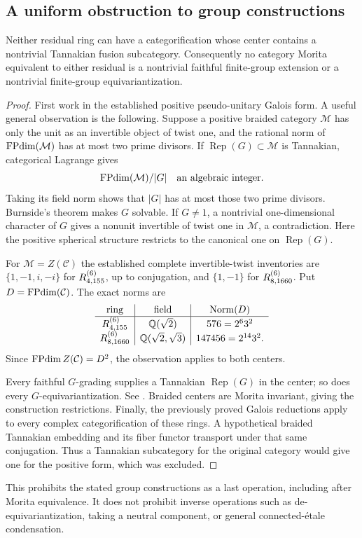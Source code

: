 \subsection{A uniform obstruction to group constructions}
\begin{proposition}\label{refined:prop:no-tannakian}
Neither residual ring can have a categorification whose center contains a nontrivial Tannakian fusion subcategory. Consequently no category Morita equivalent to either residual is a nontrivial faithful finite-group extension or a nontrivial finite-group equivariantization.
\end{proposition}
\begin{proof}
First work in the established positive pseudo-unitary Galois form. A useful general observation is the following. Suppose a positive braided category $\mathcal M$ has only the unit as an invertible object of twist one, and the rational norm of $\operatorname{FPdim}(\mathcal M)$ has at most two prime divisors. If $\operatorname{Rep}(G)\subset\mathcal M$ is Tannakian, categorical Lagrange gives
\[
 \operatorname{FPdim}(\mathcal M)/|G|\quad\hbox{an algebraic integer}.
\]
Taking its field norm shows that $|G|$ has at most those two prime divisors. Burnside's theorem makes $G$ solvable. If $G\ne1$, a nontrivial one-dimensional character of $G$ gives a nonunit invertible of twist one in $\mathcal M$, a contradiction. Here the positive spherical structure restricts to the canonical one on $\operatorname{Rep}(G)$.

For $\mathcal M=Z(\mathcal C)$ the established complete invertible-twist inventories are $\{1,-1,i,-i\}$ for $R^{(6)}_{4,155}$, up to conjugation, and $\{1,-1\}$ for $R^{(6)}_{8,1660}$. Put $D=\operatorname{FPdim}(\mathcal C)$. The exact norms are
\[
 \begin{array}{c|c|c}
 \text{ring}&\text{field}&\operatorname{Norm}(D)\\\hline
 R^{(6)}_{4,155}&\mathbb Q(\sqrt2)&576=2^6 3^2\\
 R^{(6)}_{8,1660}&\mathbb Q(\sqrt2,\sqrt3)&147456=2^{14}3^2.
 \end{array}
\]
Since $\operatorname{FPdim} Z(\mathcal C)=D^2$, the observation applies to both centers.

Every faithful $G$-grading supplies a Tannakian $\operatorname{Rep}(G)$ in the center; so does every $G$-equivariantization. See \cite[Propositions 8.23.1 and 8.23.11]{EGNO}. Braided centers are Morita invariant, giving the construction restrictions. Finally, the previously proved Galois reductions apply to every complex categorification of these rings. A hypothetical braided Tannakian embedding and its fiber functor transport under that same conjugation. Thus a Tannakian subcategory for the original category would give one for the positive form, which was excluded.
\end{proof}
This prohibits the stated group constructions as a last operation, including after Morita equivalence. It does not prohibit inverse operations such as de-equivariantization, taking a neutral component, or general connected-\'etale condensation.

